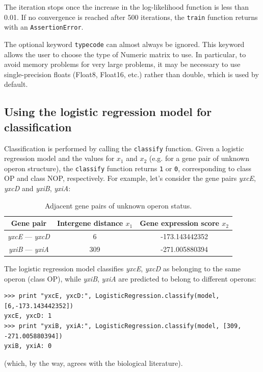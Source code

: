 \documentclass{report}
\begin{document}
The iteration stops once the increase in the log-likelihood function is less than 0.01. If no convergence is reached after 500 iterations, the \verb+train+ function returns with an \verb+AssertionError+.

The optional keyword \verb+typecode+ can almost always be ignored. This keyword allows the user to choose the type of Numeric matrix to use. In particular, to avoid memory problems for very large problems, it may be necessary to use single-precision floats (Float8, Float16, etc.) rather than double, which is used by default.

\subsection{Using the logistic regression model for classification}

Classification is performed by calling the \verb+classify+ function. Given a logistic regression model and the values for $x_1$ and $x_2$ (e.g. for a gene pair of unknown operon structure), the \verb+classify+ function returns \verb+1+ or \verb+0+, corresponding to class OP and class NOP, respectively. For example, let's consider the gene pairs {\it yxcE}, {\it yxcD} and {\it yxiB}, {\it yxiA}:

\begin{table}[h]
\begin{center}
\caption{Adjacent gene pairs of unknown operon status.}
\begin{tabular}{|c|c|c|}
\hline
Gene pair & Intergene distance $x_1$ & Gene expression score $x_2$ \\
\hline
{\it yxcE} --- {\it yxcD} & 6 & -173.143442352 \\
{\it yxiB} --- {\it yxiA} & 309 & -271.005880394 \\
\hline
\end{tabular}
\end{center}
\end{table}

The logistic regression model classifies {\it yxcE}, {\it yxcD} as belonging to the same operon (class OP), while {\it yxiB}, {\it yxiA} are predicted to belong to different operons:
\begin{verbatim}
>>> print "yxcE, yxcD:", LogisticRegression.classify(model, [6,-173.143442352])
yxcE, yxcD: 1
>>> print "yxiB, yxiA:", LogisticRegression.classify(model, [309, -271.005880394])
yxiB, yxiA: 0
\end{verbatim}
(which, by the way, agrees with the biological literature).
\end{document}
